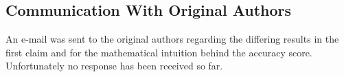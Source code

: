 \subsection{Communication With Original Authors}
An e-mail was sent to the original authors regarding the differing results in the first claim and for the mathematical intuition behind the accuracy score. Unfortunately no response has been received so far.
